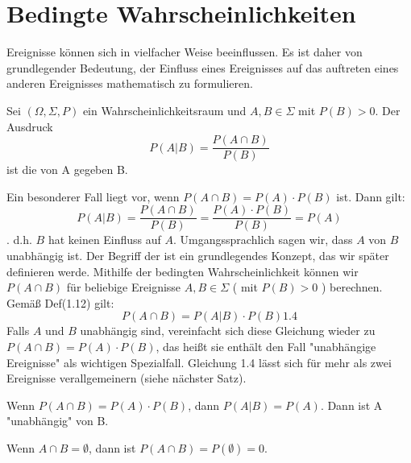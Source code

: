 \section{Bedingte Wahrscheinlichkeiten}
Ereignisse können sich in vielfacher Weise beeinflussen. Es ist daher von grundlegender Bedeutung, der Einfluss eines %
Ereignisses auf das auftreten eines anderen Ereignisses mathematisch zu formulieren.
\begin{definition}
Sei $(\Omega,\Sigma,P)$ ein Wahrscheinlichkeitsraum und $A,B \in \Sigma$ mit $P(B) > 0$. Der Ausdruck
$$ P(A|B) = \frac{P(A\cap B)}{P(B)} $$
ist die  von A gegeben B.
\end{definition}
Ein besonderer Fall liegt vor, wenn $P(A \cap B)=P(A) \cdot P(B)$ ist. Dann gilt:
$$ P(A|B) = \frac{P(A\cap B)}{P(B)} = \frac{P(A) \cdot P(B)}{P(B)} = P(A) $$.
d.h. $B$ hat keinen Einfluss auf $A$. Umgangssprachlich sagen wir, dass $A$ von $B$ unabhängig ist. Der Begriff der %
 ist ein grundlegendes Konzept, das wir später definieren werde.
Mithilfe der bedingten Wahrscheinlichkeit können wir $P(A \cap B)$ für beliebige Ereignisse $A,B \in \Sigma$ %
( mit $P(B) > 0$ ) berechnen. Gemäß Def(1.12) gilt:
$$ P(A \cap B) = P( A|B ) \cdot P(B) \text{1.4} $$
Falls $A$ und $B$ unabhängig sind, vereinfacht sich diese Gleichung wieder zu $P(A \cap B) = P(A) \cdot P(B)$, %
das heißt sie enthält den Fall "unabhängige Ereignisse" als wichtigen Spezialfall. Gleichung 1.4 lässt sich für mehr %
als zwei Ereignisse verallgemeinern (siehe nächster Satz).

Wenn $P(A \cap B) = P(A) \cdot P(B)$, dann $P(A|B) = P(A)$. Dann ist A "unabhängig" von B.

Wenn $A \cap B = \emptyset$, dann ist $P(A \cap B)=P(\emptyset)=0$.

